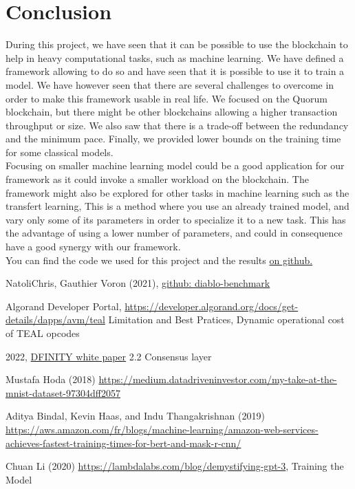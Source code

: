 \documentclass{article}
\begin{document}
\section{Conclusion}
During this project, we have seen that it can be possible to use the blockchain to help in heavy computational tasks, such as
machine learning. We have defined a framework allowing to do so and have seen that it is possible to use it to train a model.
We have however seen that there are several challenges to overcome in order to make this framework usable in real life.
We focused on the Quorum blockchain, but there might be other blockchains allowing a higher transaction throughput or size.
We also saw that there is a trade-off between the redundancy and the minimum pace. Finally, we provided lower bounds
on the training time for some classical models.\\
Focusing on smaller machine learning model could be a good application for our framework as it could invoke a smaller workload
on the blockchain. The framework might also be explored for other tasks in machine learning such as the transfert learning, This is a method where
you use an already trained model, and vary only some of its parameters in order to specialize it to a new task. This has the
advantage of using a lower number of parameters, and could in consequence have a good synergy with our framework.\\
You can find the code we used for this project and the results \href{https://github.com/douglasbouchet/ml_on_blockchain}{on github.}


\newpage
\begin{thebibliography}{9}

    NatoliChris, Gauthier Voron (2021), \href{https://github.com/NatoliChris/diablo-benchmark/tree/develop}{github: diablo-benchmark}

    Algorand Developer Portal, \href{https://developer.algorand.org/docs/get-details/dapps/avm/teal}{https://developer.algorand.org/docs/get-details/dapps/avm/teal} Limitation and Best Pratices, Dynamic operational cost of TEAL opcodes

    2022, \href{https://internetcomputer.org/whitepaper.pdf}{DFINITY white paper} 2.2 Consensus layer

    Mustafa Hoda (2018) \href{https://medium.datadriveninvestor.com/my-take-at-the-mnist-dataset-97304dff2057}{https://medium.datadriveninvestor.com/my-take-at-the-mnist-dataset-97304dff2057}

    Aditya Bindal, Kevin Haas, and Indu Thangakrishnan (2019) \href{https://aws.amazon.com/fr/blogs/machine-learning/amazon-web-services-achieves-fastest-training-times-for-bert-and-mask-r-cnn/}{https://aws.amazon.com/fr/blogs/machine-learning/amazon-web-services-achieves-fastest-training-times-for-bert-and-mask-r-cnn/}

    Chuan Li (2020) \href{https://lambdalabs.com/blog/demystifying-gpt-3}{https://lambdalabs.com/blog/demystifying-gpt-3}, Training the Model

\end{thebibliography}
\end{document}
